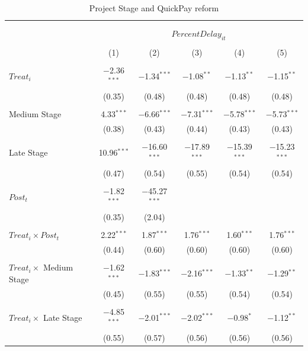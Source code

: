 \documentclass[
]{article}
\begin{document}
\begin{table}[H] \centering 
  \caption{Project Stage and QuickPay reform} 
  \label{} 
\small 
\begin{tabular}{@{\extracolsep{-2pt}}lccccc} 
\\[-1.8ex]\hline 
\hline \\[-1.8ex] 
\\[-1.8ex] & \multicolumn{5}{c}{$PercentDelay_{it}$  } \\ 
\\[-1.8ex] & (1) & (2) & (3) & (4) & (5)\\ 
\hline \\[-1.8ex] 
 $Treat_i$ & $-$2.36$^{***}$ & $-$1.34$^{***}$ & $-$1.08$^{**}$ & $-$1.13$^{**}$ & $-$1.15$^{**}$ \\ 
  & (0.35) & (0.48) & (0.48) & (0.48) & (0.48) \\ 
  & & & & & \\ 
 Medium Stage & 4.33$^{***}$ & $-$6.66$^{***}$ & $-$7.31$^{***}$ & $-$5.78$^{***}$ & $-$5.73$^{***}$ \\ 
  & (0.38) & (0.43) & (0.44) & (0.43) & (0.43) \\ 
  & & & & & \\ 
 Late Stage & 10.96$^{***}$ & $-$16.60$^{***}$ & $-$17.89$^{***}$ & $-$15.39$^{***}$ & $-$15.23$^{***}$ \\ 
  & (0.47) & (0.54) & (0.55) & (0.54) & (0.54) \\ 
  & & & & & \\ 
 $Post_t$ & $-$1.82$^{***}$ & $-$45.27$^{***}$ &  &  &  \\ 
  & (0.35) & (2.04) &  &  &  \\ 
  & & & & & \\ 
 $Treat_i \times Post_t$ & 2.22$^{***}$ & 1.87$^{***}$ & 1.76$^{***}$ & 1.60$^{***}$ & 1.76$^{***}$ \\ 
  & (0.44) & (0.60) & (0.60) & (0.60) & (0.60) \\ 
  & & & & & \\ 
 $Treat_i \times$ Medium Stage & $-$1.62$^{***}$ & $-$1.83$^{***}$ & $-$2.16$^{***}$ & $-$1.33$^{**}$ & $-$1.29$^{**}$ \\ 
  & (0.45) & (0.55) & (0.55) & (0.54) & (0.54) \\ 
  & & & & & \\ 
 $Treat_i \times$ Late Stage & $-$4.85$^{***}$ & $-$2.01$^{***}$ & $-$2.02$^{***}$ & $-$0.98$^{*}$ & $-$1.12$^{**}$ \\ 
  & (0.55) & (0.57) & (0.56) & (0.56) & (0.56) \\ 

\end{tabular}
\end{table}
\end{document}
